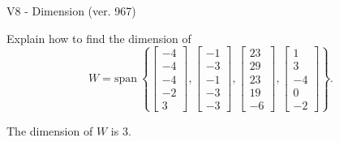 \begin{exercise}
  \begin{exerciseTitle}V8 - Dimension (ver. 967)\end{exerciseTitle}
  \begin{exerciseStatement}
    Explain how to find the dimension of 
\[W=\mathrm{span}\ \left\{\left[\begin{array}{r}
-4 \\
-4 \\
-4 \\
-2 \\
3
\end{array}\right] , \left[\begin{array}{r}
-1 \\
-3 \\
-1 \\
-3 \\
-3
\end{array}\right] , \left[\begin{array}{r}
23 \\
29 \\
23 \\
19 \\
-6
\end{array}\right] , \left[\begin{array}{r}
1 \\
3 \\
-4 \\
0 \\
-2
\end{array}\right]\right\}.\]



  \end{exerciseStatement}
  \begin{exerciseAnswer}
   The dimension of \(W\) is  \(3\).
  


  \end{exerciseAnswer}
\end{exercise}